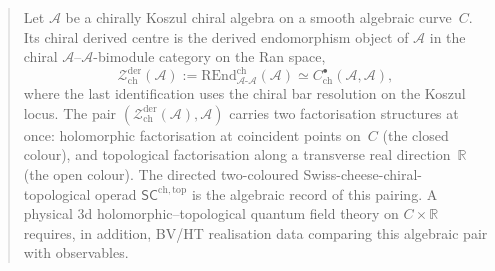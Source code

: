 \documentclass[11pt]{memoir}
\newcommand{\cA}{\mathcal{A}}
\newcommand{\R}{\mathbb{R}}
\providecommand{\cZ}{\mathcal{Z}}
\newcommand{\SCchtop}{{\mathsf{SC}^{\mathrm{ch,top}}}}
\begin{document}
\begin{abstract}
\itshape

\noindent
Let $\cA$ be a chirally Koszul chiral algebra on a smooth
algebraic curve~$C$.  Its chiral derived centre is the derived
endomorphism object of $\cA$ in the chiral $\cA$--$\cA$-bimodule
category on the Ran space,
\[
\cZ^{\mathrm{der}}_{\mathrm{ch}}(\cA)
:=\mathrm{REnd}^{\mathrm{ch}}_{\cA\text{-}\cA}(\cA)
\simeq C^\bullet_{\mathrm{ch}}(\cA,\cA),
\]
where the last identification uses the chiral bar resolution on the
Koszul locus.  The pair
$(\cZ^{\mathrm{der}}_{\mathrm{ch}}(\cA),\cA)$ carries two
factorisation structures at once: holomorphic factorisation at
coincident points on~$C$ (the closed colour), and topological
factorisation along a transverse real direction~$\R$ (the open
colour). The directed two-coloured
Swiss-cheese-chiral-topological operad $\SCchtop$ is the
algebraic record of this pairing.  A physical 3d
holomorphic--topological quantum field theory on $C\times\R$
requires, in addition, BV/HT realisation data comparing this algebraic
pair with observables.

\smallskip


\end{abstract}
\end{document}
